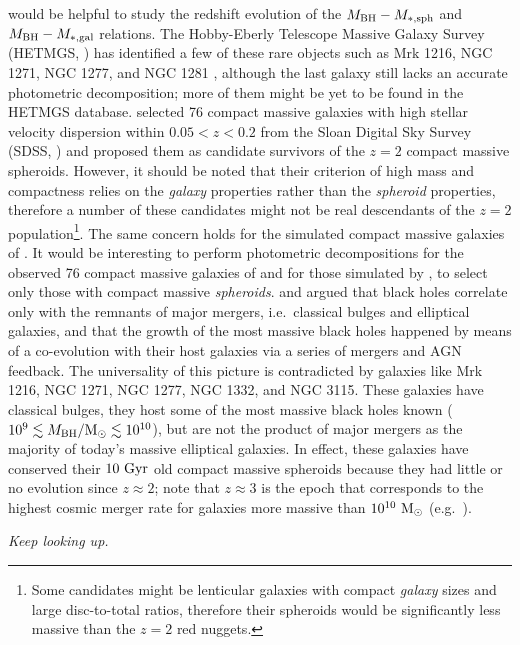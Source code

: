 would be helpful to study the redshift evolution of the $M_{\rm BH} - M_{\rm *,sph}$ 
and $M_{\rm BH} - M_{\rm *,gal}$ relations. 
The Hobby-Eberly Telescope Massive Galaxy Survey (HETMGS, \citealt{vandenBosch2015}) 
has identified a few of these rare objects 
such as Mrk 1216, NGC 1271, NGC 1277, and NGC 1281 \citep{yildirim2016}, 
although the last galaxy still lacks an accurate photometric decomposition; 
more of them might be yet to be found in the HETMGS database. 
\citet{saulder2015} selected 76 compact massive galaxies with high stellar velocity dispersion within $0.05 < z < 0.2$ 
from the Sloan Digital Sky Survey (SDSS, \citealt{abazajian2009}) 
and proposed them as candidate survivors of the $z=2$ compact massive spheroids. 
However, it should be noted that their criterion of high mass and compactness relies on the \emph{galaxy} properties 
rather than the \emph{spheroid} properties, 
therefore a number of these candidates might not be real descendants of the $z=2$ population\footnote{Some 
candidates might be lenticular galaxies with compact \emph{galaxy} sizes and large disc-to-total ratios, 
therefore their spheroids would be significantly less massive than the $z=2$ red nuggets. }. 
The same concern holds for the simulated compact massive galaxies of \citet{wellons2016}. 
It would be interesting to perform photometric decompositions 
for the observed 76 compact massive galaxies of \citet{saulder2015} 
and for those simulated by \citet{wellons2016}, 
to select only those with compact massive \emph{spheroids}. 
\citet{kormendy2011} and \citet{kormendyho2013} argued that black holes correlate only 
with the remnants of major mergers, i.e.~classical bulges and elliptical galaxies, 
and that the growth of the most massive black holes happened by means of a co-evolution with their host galaxies 
via a series of mergers and AGN feedback. 
The universality of this picture is contradicted by galaxies like Mrk 1216, NGC 1271, NGC 1277, NGC 1332, and NGC 3115. 
These galaxies have classical bulges, 
they host some of the most massive black holes known ($10^9 \lesssim M_{\rm BH}/{\rm M_\odot} \lesssim 10^{10}$), 
but are not the product of major mergers as the majority of today's massive elliptical galaxies. 
In effect, these galaxies have conserved their $10 \rm~Gyr$ old compact massive spheroids 
because they had little or no evolution since $z \approx 2$; 
note that $z \approx 3$ is the epoch that corresponds to the highest cosmic merger rate 
for galaxies more massive than $10^{10} \rm~M_\odot$ (e.g.~\citealt{conselice2008}). 


\vspace{5cm}
\begin{flushright}
\emph{Keep looking up. }
\end{flushright}

 
